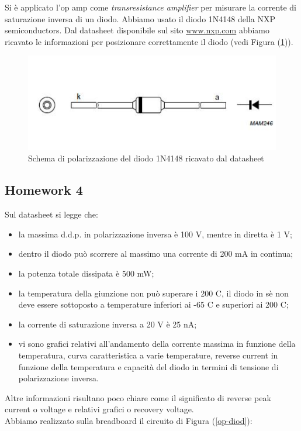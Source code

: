 \documentclass[journal, a4paper]{IEEEtran}
\begin{document}
Si è applicato l'op amp come \textit{transresistance amplifier} per misurare la corrente di saturazione inversa di un diodo. Abbiamo usato il diodo 1N4148 della NXP semiconductors. Dal datasheet disponibile sul sito \url{www.nxp.com} abbiamo ricavato le informazioni per posizionare correttamente il diodo (vedi Figura (\ref{diodo})).

\begin{figure}[htp]
\centering
\includegraphics[scale=.45]{dido}
\caption{Schema di polarizzazione del diodo 1N4148 ricavato dal datasheet}
\label{diodo}
\end{figure}

\subsection{Homework 4}

Sul datasheet si legge che:

\begin{itemize}
\item la massima d.d.p. in polarizzazione inversa è 100 V, mentre in diretta è 1 V;
\item dentro il diodo può scorrere al massimo una corrente di 200 mA in continua;
\item la potenza totale dissipata è 500 mW;
\item la temperatura della giunzione non può superare i 200 C, il diodo in sè non deve essere sottoposto a temperature inferiori ai -65 C e superiori ai 200 C;
\item la corrente di saturazione inversa a 20 V è 25 nA;
\item vi sono grafici relativi all'andamento della corrente massima in funzione della temperatura, curva caratteristica a varie temperature, reverse current in funzione della temperatura e capacità del diodo in termini di tensione di polarizzazione inversa.\\
\end{itemize}

Altre informazioni risultano poco chiare come il significato di reverse peak current o voltage e relativi grafici o recovery voltage.\\
Abbiamo realizzato sulla breadboard il circuito di Figura (\ref{op-diod}):\\
\end{document}
